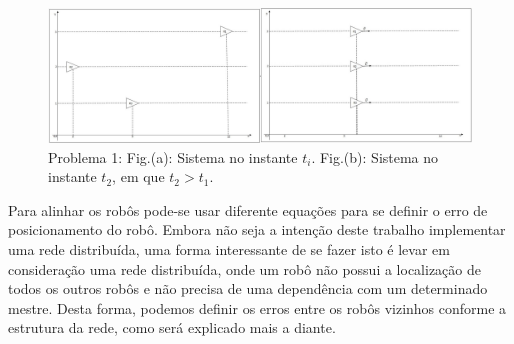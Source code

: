 \begin{figure}[!htb]
	\centering
	\includegraphics[width=16cm]{./04-figuras/p1}
	\caption{Problema 1: Fig.(a): Sistema no instante $t_{i}$. Fig.(b): Sistema no instante $t_{2}$, em que $t_{2}$$>$$t_{1}$.}
	\label{fig:p1}
\end{figure}

Para alinhar os robôs pode-se usar diferente equações para se definir o erro de posicionamento do robô. Embora não seja a intenção deste trabalho implementar uma rede distribuída, uma forma interessante de se fazer isto é levar em consideração uma rede distribuída, onde um robô não possui a localização de todos os outros robôs e não precisa de uma dependência com um determinado mestre. Desta forma, podemos definir os erros entre os robôs vizinhos conforme a estrutura da rede, como será explicado mais a diante.

